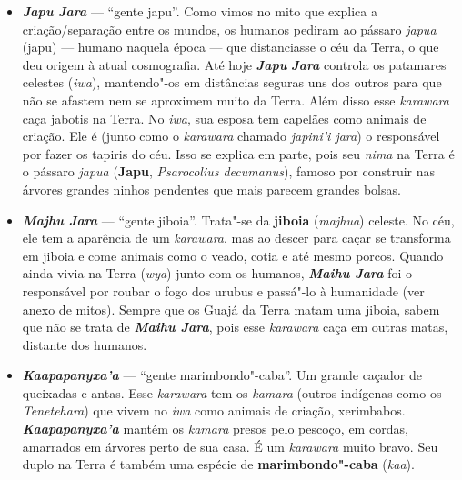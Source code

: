 \begin{itemize}
  disseram certa vez. \emph{\textbf{Takwariroxa'a}} é o próprio
  crepúsculo. As marcas vermelhas que eventualmente aparecem no céu
  durante o pôr"-do"-sol são a trilha feita por
  \emph{\textbf{Takwariroxa'a}}, e é por ela que os \emph{karawara}
  passam levando água da Terra para os patamares celestes. O duplo
  terrestre desse \emph{karawara} são as folhas de uma taquara chamada
  \emph{takwari ruy}.
\item
  \textbf{\emph{Japu} \emph{Jara}} --- ``gente japu''. Como vimos no mito
  que explica a criação/separação entre os mundos, os humanos pediram ao
  pássaro \emph{japua} (japu) --- humano naquela época --- que distanciasse
  o céu da Terra, o que deu origem à atual cosmografia. Até hoje
  \emph{\textbf{Japu}} \emph{\textbf{Jara}} controla os patamares
  celestes (\emph{iwa}), mantendo"-os em distâncias seguras uns dos
  outros para que não se afastem nem se aproximem muito da Terra. Além
  disso esse \emph{karawara} caça jabotis na Terra. No \emph{iwa}, sua
  esposa tem capelães como animais de criação. Ele é (junto como o
  \emph{karawara} chamado \emph{japini'i jara}) o responsável por fazer
  os tapiris do céu. Isso se explica em parte, pois seu \emph{nima} na
  Terra é o pássaro \emph{japua} (\textbf{Japu}, \emph{Psarocolius
  decumanus}), famoso por construir nas árvores grandes ninhos pendentes
  que mais parecem grandes bolsas.
\item
  \emph{\textbf{Majhu Jara}} --- ``gente jiboia''. Trata"-se da
  \textbf{jiboia} (\emph{majhua}) celeste. No céu, ele tem a aparência
  de um \emph{karawara}, mas ao descer para caçar se transforma em
  jiboia e come animais como o veado, cotia e até mesmo porcos. Quando
  ainda vivia na Terra (\emph{wya}) junto com os humanos,
  \emph{\textbf{Maihu Jara}} foi o responsável por roubar o fogo dos
  urubus e passá"-lo à humanidade (ver anexo de mitos). Sempre que os
  Guajá da Terra matam uma jiboia, sabem que não se trata de
  \emph{\textbf{Maihu Jara}}, pois esse \emph{karawara} caça em outras
  matas, distante dos humanos.
\item
  \emph{\textbf{Kaapapanyxa'a}} --- ``gente marimbondo"-caba''. Um grande
  caçador de queixadas e antas. Esse \emph{karawara} tem os
  \emph{kamara} (outros indígenas como os \emph{Tenetehara}) que vivem
  no \emph{iwa} como animais de criação, xerimbabos.
  \emph{\textbf{Kaapapanyxa'a}} mantém os \emph{kamara} presos pelo
  pescoço, em cordas, amarrados em árvores perto de sua casa. É um
  \emph{karawara} muito bravo. Seu duplo na Terra é também uma espécie
  de \textbf{marimbondo"-caba} (\emph{kaa}).

\end{itemize}
